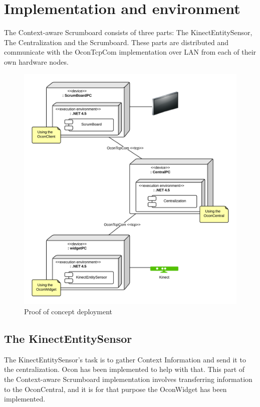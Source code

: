 \documentclass[../report.tex]{subfiles}
\begin{document}
\section{Implementation and environment}

The Context-aware Scrumboard consists of three parts: The KinectEntitySensor, The Centralization and the Scrumboard. These parts are distributed and communicate with the OconTcpCom implementation over LAN from each of their own hardware nodes.

\begin{figure}[H]
\includegraphics[width=\linewidth]{./ProofOfConceptDeployment.png}
\caption{Proof of concept deployment}
\label{fig:ProofofConceptDeployment}
\end{figure}

\subsection{The KinectEntitySensor}
The KinectEntitySensor's task is to gather Context Information and send it to the centralization. Ocon has been implemented to help with that. This part of the Context-aware Scrumboard implementation involves transferring information to the OconCentral, and it is for that purpose the OconWidget has been implemented.
\end{document}
